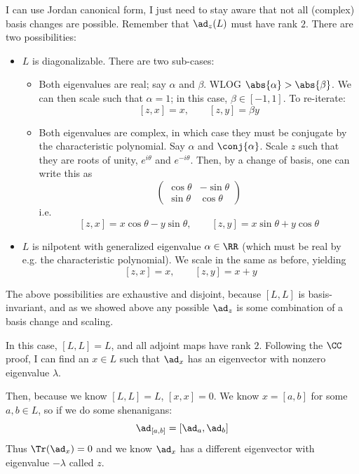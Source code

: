 \documentclass[11pt, headheight=30pt]{scrartcl}
\begin{document}
I can use Jordan
canonical form, I just need to stay aware that not all (complex)
basis changes are possible. Remember that $\ad_z(L)$ must have
rank $2$. There are two possibilities:
\begin{itemize}
    \item $L$ is diagonalizable. There are two sub-cases:
    \begin{itemize}
        \item Both eigenvalues are real; say $\alpha$ and $\beta$.
        WLOG $\abs{\alpha} > \abs{\beta}$. We can then scale
        such that $\alpha = 1$; in this case,
        $\beta \in [-1, 1]$. To re-iterate:
        \[
            [z,x] = x,\qquad [z,y] = \beta y    
        \]
        \item Both eigenvalues are complex, in which case
        they must be conjugate by the characteristic polynomial.
        Say $\alpha$ and $\conj{\alpha}$. Scale $z$
        such that they are roots of unity, $e^{i\theta}$
        and $e^{-i\theta}$. Then, by a change of basis,
        one can write this as
        \[
            \begin{pmatrix}
                \cos \theta & -\sin \theta \\
                \sin \theta & \cos \theta
            \end{pmatrix}    
        \]
        i.e.
        \[
            [z,x] = x\cos \theta - y\sin \theta,\qquad [z,y] = x\sin \theta + y\cos \theta    
        \]
    \end{itemize}
    \item $L$ is nilpotent with generalized eigenvalue $\alpha\in \RR$
    (which must be real by e.g. the characteristic polynomial).
    We scale in the same as before, yielding
    \[
        [z,x] = x, \qquad [z,y] = x + y    
    \]
\end{itemize}

The above possibilities are exhaustive and disjoint, because $[L,L]$
is basis-invariant, and as we showed above any possible $\ad_z$
is some combination of a basis change and scaling.

\begin{rcase*}
\end{rcase*}

In this case, $[L,L] = L$, and all adjoint maps
have rank $2$. Following the $\CC$ proof, I can
find an $x\in L$ such that $\ad_x$ has an eigenvector
with nonzero eigenvalue $\lambda$.

Then, because we know $[L,L] = L$, $[x,x] = 0$.
We know $x = [a,b]$ for some $a,b\in L$, so
if we do some shenanigans:
\[
    \ad_{[a,b]} = [\ad_a, \ad_b]
\]
Thus $\Tr(\ad_{x}) = 0$ and we know $\ad_x$ has a different eigenvector
with eigenvalue $-\lambda$ called $z$.
\end{document}
